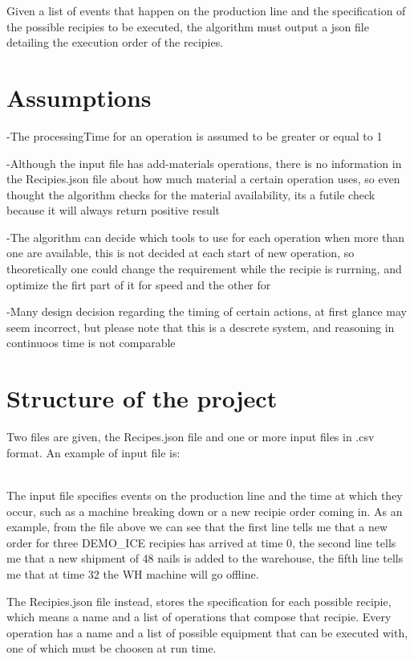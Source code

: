 \documentclass[12pt]{article}
\begin{document}
Given a list of events that happen on the production line and the specification of the possible recipies to be executed, the algorithm must output a json file detailing the execution order of the recipies.

\section{Assumptions}

-The processingTime for an operation is assumed to be greater or equal to 1

-Although the input file has add-materials operations, there is no information in the Recipies.json file about how much material a certain operation uses, so even thought the algorithm checks for the material availability, its a futile check because it will always return positive result

-The algorithm can decide which tools to use for each operation when more than one are available, this is not decided at each start of new operation, so theoretically one could change the requirement while the recipie is rurrning, and optimize the firt part of it for speed and the other for

-Many design decision regarding the timing of certain actions, at first glance may seem incorrect, but please note that this is a descrete system, and reasoning in continuoos time is not comparable

\section{Structure of the project}

Two files are given, the Recipes.json file and one or more input files in .csv format.
An example of input file is:

\\

The input file specifies events on the production line and the time at which they occur, such as a machine breaking down or a new recipie order coming in. As an example, from the file above we can see that the first line tells me that a new order for three DEMO\_ICE recipies has arrived at time 0, the second line tells me that a new shipment of 48 nails is added to the warehouse, the fifth line tells me that at time 32 the WH machine will go offline.

The Recipies.json file instead, stores the specification for each possible recipie, which means a name and a list of operations that compose that recipie. Every operation has a name and a list of possible equipment that can be executed with, one of which must be choosen at run time.
\end{document}
